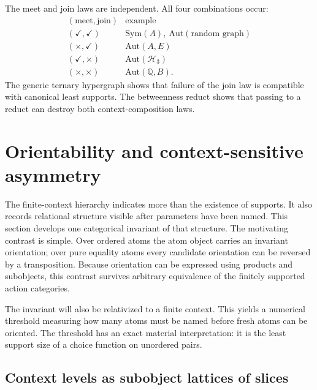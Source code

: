 \documentclass{lmcs}
\newcommand{\Sym}{\mathrm{Sym}}
\newcommand{\Aut}{\mathrm{Aut}}
\begin{document}
\begin{rem}\label{rem:quadrants}
The meet and join laws are independent. All four combinations occur:
\[
\begin{array}{c|c}
(\text{meet},\text{join}) & \text{example}\\ \hline
(\checkmark,\checkmark) & \Sym(A),\ \Aut(\text{random graph})\\
(\times,\checkmark) & \Aut(A,E)\\
(\checkmark,\times) & \Aut(\mathcal H_3)\\
(\times,\times) & \Aut(\mathbb Q,B).
\end{array}
\]
The generic ternary hypergraph shows that failure of the join law is
compatible with canonical least supports. The betweenness reduct shows
that passing to a reduct can destroy both context-composition laws.
\end{rem}


\section{Orientability and context-sensitive asymmetry}\label{sec:orient}

The finite-context hierarchy indicates more than the existence of supports.
It also records relational structure visible after parameters have been
named. This section develops one categorical invariant of that structure.
The motivating contrast is simple. Over ordered atoms the atom object
carries an invariant orientation; over pure equality atoms every candidate
orientation can be reversed by a transposition. Because orientation can be
expressed using products and subobjects, this contrast survives arbitrary
equivalence of the finitely supported action categories.

The invariant will also be relativized to a finite context. This yields a
numerical threshold measuring how many atoms must be named before fresh
atoms can be oriented. The threshold has an exact material interpretation:
it is the least support size of a choice function on unordered pairs.

\subsection{Context levels as subobject lattices of slices}
\end{document}
